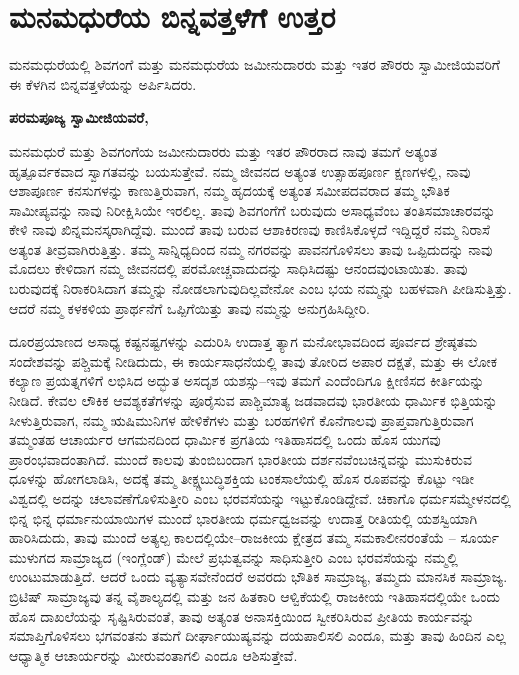 
\chapter{ಮನಮಧುರೆಯ ಬಿನ್ನವತ್ತಳೆಗೆ ಉತ್ತರ}

ಮನಮಧುರೆಯಲ್ಲಿ ಶಿವಗಂಗೆ ಮತ್ತು ಮನಮಧುರೆಯ ಜಮೀನುದಾರರು ಮತ್ತು ಇತರ ಪೌರರು ಸ್ವಾಮೀಜಿಯವರಿಗೆ ಈ ಕೆಳಗಿನ ಬಿನ್ನವತ್ತಳೆಯನ್ನು ಅರ್ಪಿಸಿದರು. 

\textbf{ಪರಮಪೂಜ್ಯ ಸ್ವಾಮೀಜಿಯವರೆ, }

ಮನಮಧುರೆ ಮತ್ತು ಶಿವಗಂಗೆಯ ಜಮೀನುದಾರರು ಮತ್ತು ಇತರ ಪೌರರಾದ ನಾವು ತಮಗೆ ಅತ್ಯಂತ ಹೃತ್ಪೂರ್ವಕವಾದ ಸ್ವಾಗತವನ್ನು ಬಯಸುತ್ತೇವೆ. ನಮ್ಮ ಜೀವನದ ಅತ್ಯಂತ ಉತ್ಸಾಹಪೂರ್ಣ ಕ್ಷಣಗಳಲ್ಲಿ, ನಾವು ಆಶಾಪೂರ್ಣ ಕನಸುಗಳನ್ನು ಕಾಣುತ್ತಿರುವಾಗ, ನಮ್ಮ ಹೃದಯಕ್ಕೆ ಅತ್ಯಂತ ಸಮೀಪದವರಾದ ತಮ್ಮ ಭೌತಿಕ ಸಾಮೀಪ್ಯವನ್ನು ನಾವು ನಿರೀಕ್ಷಿಸಿಯೇ ಇರಲಿಲ್ಲ. ತಾವು ಶಿವಗಂಗೆಗೆ ಬರುವುದು ಅಸಾಧ್ಯವೆಂಬ ತಂತಿಸಮಾಚಾರವನ್ನು ಕೇಳಿ ನಾವು ಖಿನ್ನಮನಸ್ಕರಾಗಿದ್ದೆವು. ಮುಂದೆ ತಾವು ಬರುವ ಆಶಾಕಿರಣವು ಕಾಣಿಸಿಕೊಳ್ಳದೆ ಇದ್ದಿದ್ದರೆ ನಮ್ಮ ನಿರಾಸೆ ಅತ್ಯಂತ ತೀವ್ರವಾಗಿರುತ್ತಿತ್ತು. ತಮ್ಮ ಸಾನ್ನಿಧ್ಯದಿಂದ ನಮ್ಮ ನಗರವನ್ನು ಪಾವನಗೊಳಿಸಲು ತಾವು ಒಪ್ಪಿದುದನ್ನು ನಾವು ಮೊದಲು ಕೇಳಿದಾಗ ನಮ್ಮ ಜೀವನದಲ್ಲಿ ಪರಮೋಚ್ಚವಾದುದನ್ನು ಸಾಧಿಸಿದಷ್ಟು ಆನಂದವುಂಟಾಯಿತು. ತಾವು ಬರುವುದಕ್ಕೆ ನಿರಾಕರಿಸಿದಾಗ ತಮ್ಮನ್ನು ನೋಡಲಾಗುವುದಿಲ್ಲವೇನೋ ಎಂಬ ಭಯ ನಮ್ಮನ್ನು ಬಹಳವಾಗಿ ಪೀಡಿಸುತ್ತಿತ್ತು. ಆದರೆ ನಮ್ಮ ಕಳಕಳಿಯ ಪ್ರಾರ್ಥನೆಗೆ ಒಪ್ಪಿಗೆಯಿತ್ತು ತಾವು ನಮ್ಮನ್ನು ಅನುಗ್ರಹಿಸಿದ್ದೀರಿ. 

ದೂರಪ್ರಯಾಣದ ಅಸಾಧ್ಯ ಕಷ್ಟನಷ್ಟಗಳನ್ನು ಎದುರಿಸಿ ಉದಾತ್ತ ತ್ಯಾಗ ಮನೋಭಾವದಿಂದ ಪೂರ್ವದ ಶ್ರೇಷ್ಠತಮ ಸಂದೇಶವನ್ನು ಪಶ್ಚಿಮಕ್ಕೆ ನೀಡಿದುದು, ಈ ಕಾರ್ಯಸಾಧನೆಯಲ್ಲಿ ತಾವು ತೋರಿದ ಅಪಾರ ದಕ್ಷತೆ, ಮತ್ತು ಈ ಲೋಕ ಕಲ್ಯಾಣ ಪ್ರಯತ್ನಗಳಿಗೆ ಲಭಿಸಿದ ಅದ್ಭುತ ಅಸದೃಶ ಯಶಸ್ಸು–ಇವು ತಮಗೆ ಎಂದೆಂದಿಗೂ ಕ್ಷೀಣಿಸದ ಕೀರ್ತಿಯನ್ನು ನೀಡಿದೆ. ಕೇವಲ ಲೌಕಿಕ ಆವಶ್ಯಕತೆಗಳನ್ನು ಪೂರೈಸುವ ಪಾಶ್ಚಿಮಾತ್ಯ ಜಡವಾದವು ಭಾರತೀಯ ಧಾರ್ಮಿಕ ಭಿತ್ತಿಯನ್ನು ಸೀಳುತ್ತಿರುವಾಗ, ನಮ್ಮ ಋಷಿಮುನಿಗಳ ಹೇಳಿಕೆಗಳು ಮತ್ತು ಬರಹಗಳಿಗೆ ಕೊನೆಗಾಲವು ಪ್ರಾಪ್ತವಾಗುತ್ತಿರುವಾಗ ತಮ್ಮಂತಹ ಆಚಾರ್ಯರ ಆಗಮನದಿಂದ ಧಾರ್ಮಿಕ ಪ್ರಗತಿಯ ಇತಿಹಾಸದಲ್ಲಿ ಒಂದು ಹೊಸ ಯುಗವು ಪ್ರಾರಂಭವಾದಂತಾಗಿದೆ. ಮುಂದೆ ಕಾಲವು ತುಂಬಿಬಂದಾಗ ಭಾರತೀಯ ದರ್ಶನವೆಂಬ\break ಚಿನ್ನವನ್ನು ಮುಸುಕಿರುವ ಧೂಳನ್ನು ಹೋಗಲಾಡಿಸಿ, ಅದಕ್ಕೆ ತಮ್ಮ ತೀಕ್ಷ್ಣಬುದ್ಧಿಶಕ್ತಿಯ ಟಂಕಸಾಲೆಯಲ್ಲಿ ಹೊಸ ರೂಪವನ್ನು ಕೊಟ್ಟು ಇಡೀ ವಿಶ್ವದಲ್ಲಿ ಅದನ್ನು ಚಲಾವಣೆಗೊಳಿಸುತ್ತೀರಿ ಎಂಬ ಭರವಸೆಯನ್ನು ಇಟ್ಟುಕೊಂಡಿದ್ದೇವೆ. ಚಿಕಾಗೊ ಧರ್ಮಸಮ್ಮೇಳನದಲ್ಲಿ ಭಿನ್ನ ಭಿನ್ನ ಧರ್ಮಾನುಯಾಯಿಗಳ ಮುಂದೆ ಭಾರತೀಯ ಧರ್ಮಧ್ವಜವನ್ನು ಉದಾತ್ತ ರೀತಿಯಲ್ಲಿ ಯಶಸ್ವಿಯಾಗಿ ಹಾರಿಸಿದುದು, ತಾವು ಮುಂದೆ ಅತ್ಯಲ್ಪ ಕಾಲದಲ್ಲಿಯೇ–ರಾಜಕೀಯ ಕ್ಷೇತ್ರದ ತಮ್ಮ ಸಮಕಾಲೀನರಂತೆಯೆ – ಸೂರ್ಯ ಮುಳುಗದ ಸಾಮ್ರಾಜ್ಯದ (ಇಂಗ್ಲೆಂಡ್​) ಮೇಲೆ ಪ್ರಭುತ್ವವನ್ನು ಸಾಧಿಸುತ್ತೀರಿ ಎಂಬ ಭರವಸೆಯನ್ನು ನಮ್ಮಲ್ಲಿ ಉಂಟುಮಾಡುತ್ತಿದೆ. ಆದರೆ ಒಂದು ವ್ಯತ್ಯಾಸವೇನೆಂದರೆ ಅವರದು ಭೌತಿಕ ಸಾಮ್ರಾಜ್ಯ, ತಮ್ಮದು ಮಾನಸಿಕ ಸಾಮ್ರಾಜ್ಯ. ಬ್ರಿಟಿಷ್​ ಸಾಮ್ರಾಜ್ಯವು ತನ್ನ ವೈಶಾಲ್ಯದಲ್ಲಿ ಮತ್ತು ಜನ ಹಿತಕಾರಿ ಆಳ್ವಿಕೆಯಲ್ಲಿ ರಾಜಕೀಯ ಇತಿಹಾಸದಲ್ಲಿಯೇ ಒಂದು ಹೊಸ ದಾಖಲೆಯನ್ನು ಸೃಷ್ಟಿಸಿರುವಂತೆ, ತಾವು ಅತ್ಯಂತ ಅನಾಸಕ್ತಿಯಿಂದ ಸ್ವೀಕರಿಸಿರುವ ಪ್ರೀತಿಯ ಕಾರ್ಯವನ್ನು ಸಮಾಪ್ತಿಗೊಳಿಸಲು ಭಗವಂತನು ತಮಗೆ ದೀರ್ಘಾಯುಷ್ಯವನ್ನು ದಯಪಾಲಿಸಲಿ ಎಂದೂ, ಮತ್ತು ತಾವು ಹಿಂದಿನ ಎಲ್ಲ ಆಧ್ಯಾತ್ಮಿಕ ಆಚಾರ್ಯರನ್ನು ಮೀರುವಂತಾಗಲಿ ಎಂದೂ ಆಶಿಸುತ್ತೇವೆ.

